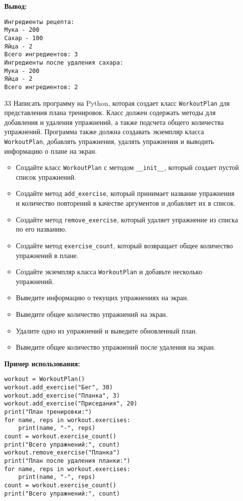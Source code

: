 \begin{enumerate}
\textbf{Вывод:}
\begin{verbatim}
Ингредиенты рецепта:
Мука - 200
Сахар - 100
Яйца - 2
Всего ингредиентов: 3
Ингредиенты после удаления сахара:
Мука - 200
Яйца - 2
Всего ингредиентов: 2
\end{verbatim}

\item[33] Написать программу на Python, которая создает класс \texttt{WorkoutPlan} для представления плана тренировок. Класс должен содержать методы для добавления и удаления упражнений, а также подсчета общего количества упражнений. Программа также должна создавать экземпляр класса \texttt{WorkoutPlan}, добавлять упражнения, удалять упражнения и выводить информацию о плане на экран.

\begin{itemize}
    \item Создайте класс \texttt{WorkoutPlan} с методом \texttt{\_\_init\_\_}, который создает пустой список упражнений.
    \item Создайте метод \texttt{add\_exercise}, который принимает название упражнения и количество повторений в качестве аргументов и добавляет их в список.
    \item Создайте метод \texttt{remove\_exercise}, который удаляет упражнение из списка по его названию.
    \item Создайте метод \texttt{exercise\_count}, который возвращает общее количество упражнений в плане.
    \item Создайте экземпляр класса \texttt{WorkoutPlan} и добавьте несколько упражнений.
    \item Выведите информацию о текущих упражнениях на экран.
    \item Выведите общее количество упражнений на экран.
    \item Удалите одно из упражнений и выведите обновленный план.
    \item Выведите общее количество упражнений после удаления на экран.
\end{itemize}

\textbf{Пример использования:}

\begin{verbatim}
workout = WorkoutPlan()
workout.add_exercise("Бег", 30)
workout.add_exercise("Планка", 3)
workout.add_exercise("Приседания", 20)
print("План тренировки:")
for name, reps in workout.exercises:
    print(name, "-", reps)
count = workout.exercise_count()
print("Всего упражнений:", count)
workout.remove_exercise("Планка")
print("План после удаления планки:")
for name, reps in workout.exercises:
    print(name, "-", reps)
count = workout.exercise_count()
print("Всего упражнений:", count)
\end{verbatim}


\end{enumerate}
